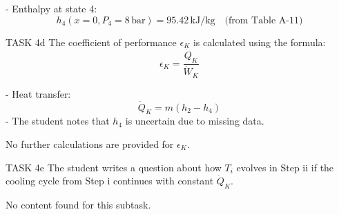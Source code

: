 - Enthalpy at state 4:  
  \[
  h_4 (x=0, P_4=8 \, \text{bar}) = 95.42 \, \text{kJ/kg} \quad \text{(from Table A-11)}  
  \]  

TASK 4d  
The coefficient of performance \( \epsilon_K \) is calculated using the formula:  
\[
\epsilon_K = \frac{\dot{Q}_K}{\dot{W}_K}
\]  

- Heat transfer:  
  \[
  \dot{Q}_K = m \left( h_2 - h_4 \right)  
  \]  
- The student notes that \( h_4 \) is uncertain due to missing data.  

No further calculations are provided for \( \epsilon_K \).  

TASK 4e  
The student writes a question about how \( T_i \) evolves in Step ii if the cooling cycle from Step i continues with constant \( \dot{Q}_K \).  

No content found for this subtask.